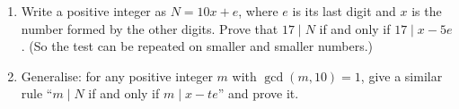 \begin{enumerate}
\item[(a)] Write a positive integer as $N=10x+e$, where $e$ is its last digit and $x$ is the number formed by the other digits. Prove that $17\mid N$ if and only if $17\mid x-5e$. (So the test can be repeated on smaller and smaller numbers.)
\item[(b)] Generalise: for any positive integer $m$ with $\gcd(m,10)=1$, give a similar rule ``$m\mid N$ if and only if $m\mid x-te$'' and prove it.
\end{enumerate}
